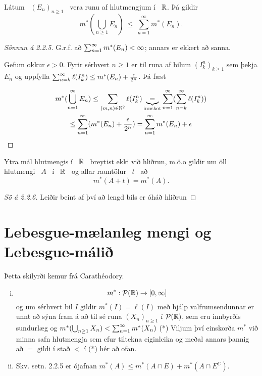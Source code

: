 \documentclass[12pt]{report}
\newcommand{\cP}{\mathcal{P}}
\begin{document}
\begin{setn*}
Látum \ $(E_n)_{n\geq 1}$ \ vera runu af hlutmengjum í \ $\mathbb{R}$. Þá gildir
\[
m^*\left(\bigcup_{n\geq 1}E_n\right)\ \leq \ \sum_{n=1}^\infty m^*(E_n).
\]
\end{setn*}

\begin{proof}[Sönnun á 2.2.5]
  G.r.f. að $\sum_{n = 1}^{\infty} m^*(E_n) < \infty$; annars er ekkert að sanna.

  Gefum okkur $\epsilon > 0$. Fyrir sérhvert $n \geq 1$ er til runa af
  bilum $(I^n_k)_{k \geq 1}$ sem þekja $E_n$ og uppfylla
  $\sum_{n = {k}}^{\infty} \ell(I^n_k) \leq m^*(E_n) + \frac{\epsilon}{2^n}$. Þá fæst

      \begin{gather*}
        m^*(\bigcup_{n=1}^{\infty} E_n) \leq \sum_{(m,n) \in \mathbb{N}^2}
        \ell(I_k^n)
        \underbrace{=}_{\text{innskot}} \sum_{n = 1}^{\infty} (\sum_{n = {k}}^{\infty} \ell(I^n_k))\\
        \leq \sum_{n = 1}^{\infty} (m^*(E_n) + \frac{\epsilon}{2^n}) = \sum_{n = 1}^{\infty} m^*(E_n) +
        \epsilon
      \end{gather*}
        
    \end{proof}
    
    \begin{setn*}
    Ytra mál hlutmengis í \ $\mathbb{R}$ \ breytist ekki við hliðrun, m.ö.o gildir um öll hlutmengi \ $A$ \ í \ $\mathbb{R}$ \ og allar rauntölur \ $t$ \ að
$$
m^*(A + t) = m^*(A).
$$
    \end{setn*}
    \begin{proof}[Sö á 2.2.6]
      Leiðir beint af því að lengd bils er óháð hliðrun
    \end{proof}

    \section{Lebesgue-mælanleg mengi og Lebesgue-málið}

    Þetta skilyrði kemur frá Carathéodory.

    \begin{ath}
      \begin{enumerate}[(i)]
      \item \[m^*: \cP(\R) \to [0, \infty] \]
        og um sérhvert bil $I$ gildir $m^{*}(I) = \ell(I)$ með hjálp
        valfrumsendunnar er unnt að sýna fram á að til sé runa
        $(X_n)_{n\geq1}$ í $\cP(\R)$, sem eru innbyrðis sundurlæg og
        $m^*(\bigcup_{n\geq1}X_n) < \sum_{n = 1}^{\infty} m^*(X_n)$ (*) Viljum
        því einskorða $ m^* $ við minna safn hlutmengja sem efur
        tiltekna eiginleika og meðal annars þannig að $=$ gildi í stað
        $<$ í (*) hér að ofan.

      \item Skv. setn. 2.2.5 er ójafnan
        $m^*(A) \leq m^*(A\cap E) + m^*(A \cap E^C)$.
     
      \end{enumerate}
    \end{ath}
\end{document}
